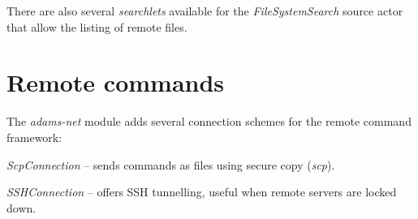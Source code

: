 \documentclass[a4paper]{book}
\begin{document}
There are also several \textit{searchlets} available for the
\textit{FileSystemSearch} source actor that allow the listing of remote
files.



\chapter{Remote commands}

The \textit{adams-net} module adds several connection schemes for the
remote command framework:

\begin{tight_itemize}
	\item \textit{ScpConnection} -- sends commands as files using secure
	copy (\textit{scp}).
	\item \textit{SSHConnection} -- offers SSH tunnelling, useful when
	remote servers are locked down.
\end{tight_itemize}


\end{document}
